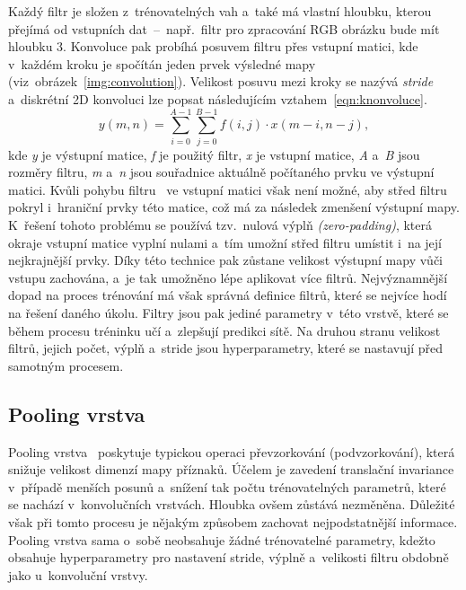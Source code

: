 Každý filtr je složen z~trénovatelných vah a~také má vlastní hloubku, kterou přejímá od vstupních dat~--~např.~filtr pro zpracování RGB obrázku bude mít hloubku 3. Konvoluce pak probíhá posuvem filtru přes vstupní matici, kde v~každém kroku je spočítán jeden prvek výsledné mapy (viz~obrázek~\ref{img:convolution}). Velikost posuvu mezi kroky se nazývá \emph{stride} a~diskrétní 2D konvoluci lze popsat následujícím vztahem~\ref{eqn:knonvoluce}.
\begin{equation}
    \label{eqn:knonvoluce}
    y(m, n) = \sum_{i = 0}^{A - 1} \sum_{j = 0}^{B - 1} f(i, j) \cdot x(m - i, n - j),
\end{equation}
kde \emph{y} je výstupní matice, \emph{f} je použitý filtr, \emph{x} je vstupní matice, \emph{A} a~\emph{B} jsou rozměry filtru, \emph{m} a~\emph{n} jsou souřadnice aktuálně počítaného prvku ve výstupní matici. Kvůli pohybu filtru~\cite{website:CNNOverviewAndApplication} ve vstupní matici však není možné, aby střed filtru pokryl i~hraniční prvky této matice, což má za následek zmenšení výstupní mapy. K~řešení tohoto problému se používá tzv.~nulová výplň \emph{(zero-padding)}, která okraje vstupní matice vyplní nulami a~tím umožní střed filtru umístit i~na její nejkrajnější prvky. Díky této technice pak zůstane velikost výstupní mapy vůči vstupu zachována, a~je tak umožněno lépe aplikovat více filtrů. Nejvýznamnější dopad na proces trénování má však správná definice filtrů, které se nejvíce hodí na řešení daného úkolu. Filtry jsou pak jediné parametry v~této vrstvě, které se během procesu tréninku učí a~zlepšují predikci sítě. Na druhou stranu velikost filtrů, jejich počet, výplň a~stride jsou hyperparametry, které se nastavují před samotným procesem.

\subsection{Pooling vrstva}
Pooling vrstva~\cite{website:CNNOverviewAndApplication} poskytuje typickou operaci převzorkování (podvzorkování), která snižuje velikost dimenzí mapy příznaků. Účelem je zavedení translační invariance v~případě menších posunů a~snížení tak počtu trénovatelných parametrů, které se nachází v~konvolučních vrstvách. Hloubka ovšem zůstává nezměněna. Důležité však při tomto procesu je nějakým způsobem zachovat nejpodstatnější informace. Pooling vrstva sama o~sobě neobsahuje žádné trénovatelné parametry, kdežto obsahuje hyperparametry pro nastavení stride, výplně a~velikosti filtru obdobně jako u~konvoluční vrstvy.

